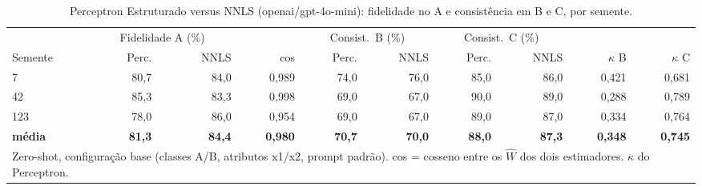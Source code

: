 \begin{table}[htbp]
\centering
\small
\caption{Perceptron Estruturado versus NNLS (openai/gpt-4o-mini): fidelidade no A e consistência em B e C, por semente.}
\label{tab:bloco1_A_perceptron_vs_nnls_por_semente_gpt4mini}
\begin{tabular}{lrrrrrrrrr}
\toprule
 & \multicolumn{2}{c}{Fidelidade A (\%)} &  & \multicolumn{2}{c}{Consist.\ B (\%)} & \multicolumn{2}{c}{Consist.\ C (\%)} &  &  \\ \cmidrule(lr){2-3} \cmidrule(lr){5-6} \cmidrule(lr){7-8}
Semente & Perc. & NNLS & cos & Perc. & NNLS & Perc. & NNLS & $\kappa$ B & $\kappa$ C \\
\midrule
7 & 80,7 & 84,0 & 0,989 & 74,0 & 76,0 & 85,0 & 86,0 & 0,421 & 0,681 \\
42 & 85,3 & 83,3 & 0,998 & 69,0 & 67,0 & 90,0 & 89,0 & 0,288 & 0,789 \\
123 & 78,0 & 86,0 & 0,954 & 69,0 & 67,0 & 89,0 & 87,0 & 0,334 & 0,764 \\
\midrule
\textbf{média} & \textbf{81,3} & \textbf{84,4} & \textbf{0,980} & \textbf{70,7} & \textbf{70,0} & \textbf{88,0} & \textbf{87,3} & \textbf{0,348} & \textbf{0,745} \\
\bottomrule
\multicolumn{10}{p{0.95\linewidth}}{\footnotesize Zero-shot, configuração base (classes A/B, atributos x1/x2, prompt padrão). cos = cosseno entre os $\hat{W}$ dos dois estimadores. $\kappa$ do Perceptron.} \\
\end{tabular}
\end{table}
